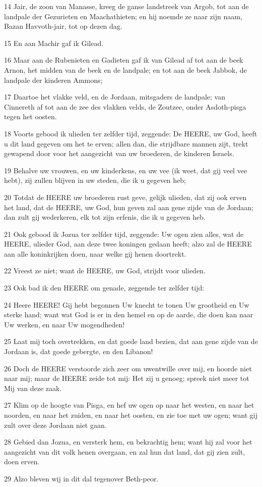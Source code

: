 \par 14 Jair, de zoon van Manasse, kreeg de ganse landstreek van Argob, tot aan de landpale der Gezurieten en Maachathieten; en hij noemde ze naar zijn naam, Bazan Havvoth-jair, tot op dezen dag.
\par 15 En aan Machir gaf ik Gilead.
\par 16 Maar aan de Rubenieten en Gadieten gaf ik van Gilead af tot aan de beek Arnon, het midden van de beek en de landpale; en tot aan de beek Jabbok, de landpale der kinderen Ammons;
\par 17 Daartoe het vlakke veld, en de Jordaan, mitsgaders de landpale; van Cinnereth af tot aan de zee des vlakken velds, de Zoutzee, onder Asdoth-pisga tegen het oosten.
\par 18 Voorts gebood ik ulieden ter zelfder tijd, zeggende: De HEERE, uw God, heeft u dit land gegeven om het te erven; allen dan, die strijdbare mannen zijt, trekt gewapend door voor het aangezicht van uw broederen, de kinderen Israels.
\par 19 Behalve uw vrouwen, en uw kinderkens, en uw vee (ik weet, dat gij veel vee hebt), zij zullen blijven in uw steden, die ik u gegeven heb;
\par 20 Totdat de HEERE uw broederen rust geve, gelijk ulieden, dat zij ook erven het land, dat de HEERE, uw God, hun geven zal aan gene zijde van de Jordaan; dan zult gij wederkeren, elk tot zijn erfenis, die ik u gegeven heb.
\par 21 Ook gebood ik Jozua ter zelfder tijd, zeggende: Uw ogen zien alles, wat de HEERE, ulieder God, aan deze twee koningen gedaan heeft; alzo zal de HEERE aan alle koninkrijken doen, naar welke gij henen doortrekt.
\par 22 Vreest ze niet; want de HEERE, uw God, strijdt voor ulieden.
\par 23 Ook bad ik den HEERE om genade, zeggende ter zelfder tijd:
\par 24 Heere HEERE! Gij hebt begonnen Uw knecht te tonen Uw grootheid en Uw sterke hand; want wat God is er in den hemel en op de aarde, die doen kan naar Uw werken, en naar Uw mogendheden!
\par 25 Laat mij toch overtrekken, en dat goede land bezien, dat aan gene zijde van de Jordaan is, dat goede gebergte, en den Libanon!
\par 26 Doch de HEERE verstoorde zich zeer om uwentwille over mij, en hoorde niet naar mij; maar de HEERE zeide tot mij: Het zij u genoeg; spreek niet meer tot Mij van deze zaak.
\par 27 Klim op de hoogte van Pisga, en hef uw ogen op naar het westen, en naar het noorden, en naar het zuiden, en naar het oosten, en zie toe met uw ogen; want gij zult over deze Jordaan niet gaan.
\par 28 Gebied dan Jozua, en versterk hem, en bekrachtig hem; want hij zal voor het aangezicht van dit volk henen overgaan, en zal hun dat land, dat gij zien zult, doen erven.
\par 29 Alzo bleven wij in dit dal tegenover Beth-peor.

